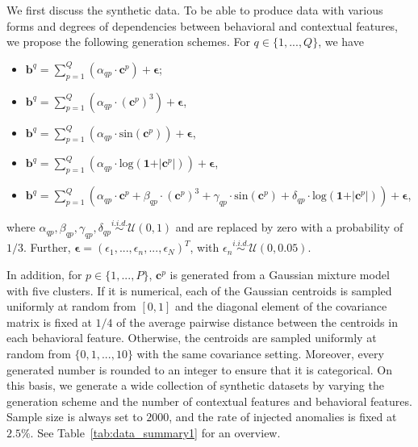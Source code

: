 \documentclass[pdflatex,sn-basic]{sn-jnl}%
\theoremstyle{thmstyleone}%
\theoremstyle{thmstyletwo}%
\theoremstyle{thmstylethree}%
\begin{document}
We first discuss the synthetic data. To be able to produce data with various forms and degrees of dependencies between behavioral and contextual features, we propose the following generation schemes. For $q \in \{1,...,Q\}$, we have
\begin{itemize}
    \item[(S1)] $\mathbf{b}^{q} = \sum_{p=1}^{Q}\left(\alpha_{qp}\cdot\mathbf{c}^{p}\right)+\boldsymbol{\epsilon}$;
    \item[(S2)] $\mathbf{b}^{q} = \sum_{p=1}^{Q}\left(\alpha_{qp}\cdot(\mathbf{c}^{p})^{3}\right)+\boldsymbol{\epsilon}$,
    \item[(S3)] $\mathbf{b}^{q} = \sum_{p=1}^{Q}\left(\alpha_{qp}\cdot\mathrm{sin}(\mathbf{c}^{p})\right)+\boldsymbol{\epsilon}$,
    \item[(S4)] $\mathbf{b}^{q} = \sum_{p=1}^{Q}\left(\alpha_{qp}\cdot\mathrm{log}(\mathbf{1}+\vert\mathbf{c}^{p}\vert)\right)+\boldsymbol{\epsilon}$,
    \item[(S5)] $\mathbf{b}^{q} = \sum_{p=1}^{Q}\left(\alpha_{qp}\cdot\mathbf{c}^{p}+\beta_{qp}\cdot(\mathbf{c}^{p})^{3}+\gamma_{qp}\cdot\mathrm{sin}(\mathbf{c}^{p})+\delta_{qp}\cdot\mathrm{log}(\mathbf{1}+\vert\mathbf{c}^{p}\vert)\right)+\boldsymbol{\epsilon}$,
\end{itemize}
where $\alpha_{qp}, \beta_{qp},\gamma_{qp}, \delta_{qp} \stackrel{i.i.d.}{\sim} \mathcal{U}(0,1)$ and are replaced by zero with a probability of $1/3$. Further, $\boldsymbol{\epsilon} = (\epsilon_{1},...,\epsilon_{n},...,\epsilon_{N})^{T}$, with $\epsilon_{n} \stackrel{i.i.d.}{\sim} \mathcal{U}(0,0.05)$. 

In addition, for $p \in \{1,...,P\}$, $\mathbf{c}^{p}$ is generated from a Gaussian mixture model with five clusters. If it is numerical, each of the Gaussian centroids is sampled uniformly at random from $[0,1]$ and the diagonal element of the covariance matrix is fixed at $1/4$ of the average pairwise distance between the centroids in each behavioral feature. Otherwise, the centroids are sampled uniformly at random from $\{0,1,...,10\}$ with the same covariance setting. Moreover, every generated number is rounded to an integer to ensure that it is categorical. On this basis, we generate a wide collection of synthetic datasets by varying the generation scheme and the number of contextual features and behavioral features. Sample size is always set to $2000$, and the rate of injected anomalies is fixed at $2.5\%$. See Table~\ref{tab:data_summary1} for an overview.
\end{document}
